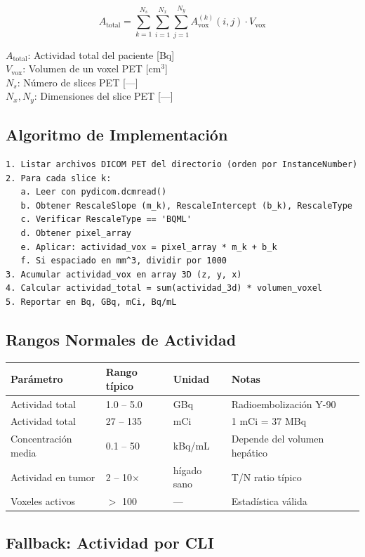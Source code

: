 \documentclass[12pt,a4paper]{article}
\newcommand{\vardef}[2]{\noindent\textbf{#1}: #2\\}
\begin{document}
$$A_{\text{total}} = \sum_{k=1}^{N_s} \sum_{i=1}^{N_x} \sum_{j=1}^{N_y} A_{\text{vox}}^{(k)}(i,j) \cdot V_{\text{vox}}$$

\vardef{$A_{\text{total}}$}{Actividad total del paciente [Bq]}
\vardef{$V_{\text{vox}}$}{Volumen de un voxel PET [cm$^3$]}
\vardef{$N_s$}{Número de slices PET [---]}
\vardef{$N_x, N_y$}{Dimensiones del slice PET [---]}

\subsection{Algoritmo de Implementación}

\begin{verbatim}
1. Listar archivos DICOM PET del directorio (orden por InstanceNumber)
2. Para cada slice k:
   a. Leer con pydicom.dcmread()
   b. Obtener RescaleSlope (m_k), RescaleIntercept (b_k), RescaleType
   c. Verificar RescaleType == 'BQML'
   d. Obtener pixel_array
   e. Aplicar: actividad_vox = pixel_array * m_k + b_k
   f. Si espaciado en mm^3, dividir por 1000
3. Acumular actividad_vox en array 3D (z, y, x)
4. Calcular actividad_total = sum(actividad_3d) * volumen_voxel
5. Reportar en Bq, GBq, mCi, Bq/mL
\end{verbatim}

\subsection{Rangos Normales de Actividad}

\begin{tabular}{p{4cm} p{2.5cm} p{2cm} p{5cm}}
\toprule
\textbf{Parámetro} & \textbf{Rango típico} & \textbf{Unidad} & \textbf{Notas} \\
\midrule
Actividad total & 1.0 -- 5.0 & GBq & Radioembolización Y-90 \\
Actividad total & 27 -- 135 & mCi & 1 mCi = 37 MBq \\
Concentración media & 0.1 -- 50 & kBq/mL & Depende del volumen hepático \\
Actividad en tumor & 2 -- 10$\times$ & hígado sano & T/N ratio típico \\
Voxeles activos & $>$ 100 & --- & Estadística válida \\
\bottomrule
\end{tabular}

\subsection{Fallback: Actividad por CLI}
\end{document}

